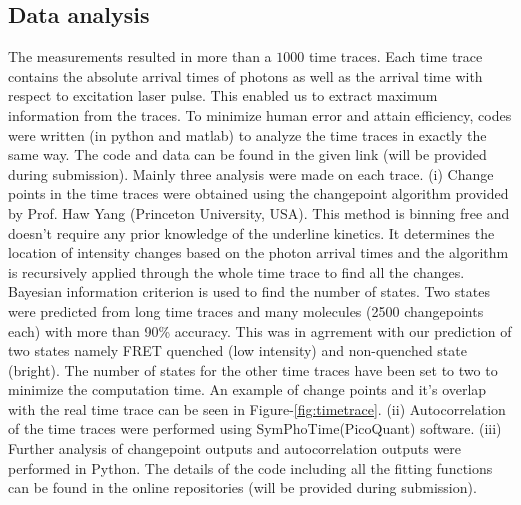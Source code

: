 \documentclass[journal=jacsat,manuscript=article]{achemso}
\begin{document}
\subsection{Data analysis}
The measurements resulted in more than a $1000$ time traces. Each time trace contains the absolute arrival times of photons as well as the arrival time with respect to excitation laser pulse. This enabled us to extract maximum information from the traces. To minimize human error and attain efficiency, codes were written (in python and matlab) to analyze the time traces in exactly the same way. The code and data can be found in the given link (will be provided during submission). Mainly three analysis were made on each trace. (i) Change points in the time traces were obtained using the changepoint algorithm\cite{watkins2005detection} provided by Prof. Haw Yang (Princeton University, USA). This method is binning free and doesn't require any prior knowledge of the underline kinetics. It determines the location of intensity changes based on the photon arrival times and the algorithm is recursively applied through the whole time trace to find all the changes. Bayesian information criterion is used to find the number of states. Two states were predicted from long time traces and many molecules (2500 changepoints each) with more than 90\% accuracy. This was in agrrement with our prediction of two states namely FRET quenched (low intensity) and non-quenched state (bright). The number of states for the other time traces have been set to two to minimize the computation time. An example of change points and it's overlap with the real time trace can be seen in Figure-\ref{fig:timetrace}. (ii) Autocorrelation of the time traces were performed using SymPhoTime(PicoQuant) software. (iii) Further analysis of changepoint outputs and autocorrelation outputs were performed in Python. The details of the code including all the fitting functions can be found in the online repositories (will be provided during submission).
\end{document}
